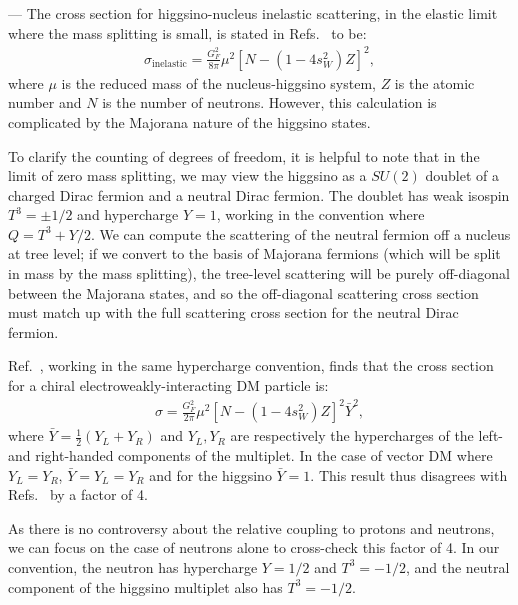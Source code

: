 \documentclass[reprint,superscriptaddress,preprintnumbers,amsmath,amssymb,aps,prd,tightenlines,longbibliography,nofootinbib]{revtex4-2}
\begin{document}
\par{}---\nobreak\ignorespaces
\makeatother
%
The cross section for higgsino-nucleus inelastic scattering, in the elastic limit where the mass splitting is small, is stated in Refs.~\cite{Nagata:2014wma,Bramante:2016rdh} to be:
\begin{align}
\sigma_\text{inelastic} = \frac{G_F^2}{8\pi} \mu^2 \left[N - (1 -4 s^2_W) Z \right]^2, 
\end{align}
where $\mu$ is the reduced mass of the nucleus-higgsino system, $Z$ is the atomic number and $N$ is the number of neutrons. However, this calculation is complicated by the Majorana nature of the higgsino states. 

To clarify the counting of degrees of freedom, it is helpful to note that in the limit of zero mass splitting, we may view the higgsino as a $SU(2)$ doublet of a charged Dirac fermion and a neutral Dirac fermion. The doublet has weak isospin $T^3=\pm 1/2$ and hypercharge $Y=1$, working in the convention where $Q=T^3 + Y/2$. We can compute the scattering of the neutral fermion off a nucleus at tree level; if we convert to the basis of Majorana fermions (which will be split in mass by the mass splitting), the tree-level scattering will be purely off-diagonal between the Majorana states, and so the off-diagonal scattering cross section must match up with the full scattering cross section for the neutral Dirac fermion. 

Ref.~\cite{Essig:2007az}, working in the same hypercharge convention, finds that the cross section for a chiral electroweakly-interacting DM particle is:
\begin{align}
\sigma = \frac{G_F^2}{2\pi} \mu^2 \left[ N - (1 -4 s^2_W) Z \right]^2 \bar{Y}^2, 
\end{align}
where $\bar{Y}=\frac{1}{2}(Y_L + Y_R)$ and $Y_L, Y_R$ are respectively the hypercharges of the left- and right-handed components of the multiplet. In the case of vector DM where $Y_L=Y_R$, $\bar{Y}=Y_L=Y_R$ and for the higgsino $\bar{Y}=1$. This result thus disagrees with Refs.~\cite{Nagata:2014wma,Bramante:2016rdh} by a factor of 4.

As there is no controversy about the relative coupling to protons and neutrons, we can focus on the case of neutrons alone to cross-check this factor of 4. In our convention, the neutron has hypercharge $Y=1/2$ and $T^3=-1/2$, and the neutral component of the higgsino multiplet also has $T^3=-1/2$.
\end{document}
